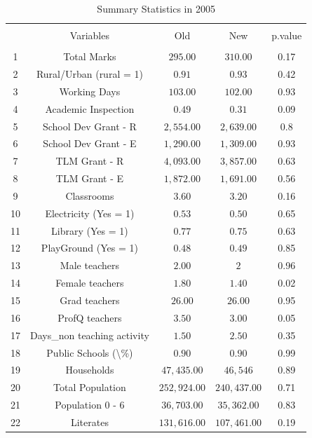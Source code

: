\documentclass[12pt, a4paper]{article}
\begin{document}
\begin{table}[!htbp] \centering 
  \caption{Summary Statistics in 2005} 
  \label{} 
\begin{tabular}{@{\extracolsep{5pt}} ccccc} 
\\[-1.8ex]\hline 
\hline \\[-1.8ex] 
 & Variables & Old & New & p.value \\ 
\hline \\[-1.8ex] 
1 & Total Marks & $295.00$ & $310.00$ & 0.17 \\ 
2 & Rural/Urban (rural = 1) & $0.91$ & $0.93$ & 0.42 \\ 
3 & Working Days & $103.00$ & $102.00$ & 0.93 \\ 
4 & Academic Inspection & $0.49$ & $0.31$ & 0.09 \\ 
5 & School Dev Grant - R & $2,554.00$ & $2,639.00$ & 0.8 \\ 
6 & School Dev Grant - E & $1,290.00$ & $1,309.00$ & 0.93 \\ 
7 & TLM Grant - R & $4,093.00$ & $3,857.00$ & 0.63 \\ 
8 & TLM Grant - E & $1,872.00$ & $1,691.00$ & 0.56 \\ 
9 & Classrooms & $3.60$ & $3.20$ & 0.16 \\ 
10 & Electricity (Yes = 1) & $0.53$ & $0.50$ & 0.65 \\ 
11 & Library  (Yes = 1) & $0.77$ & $0.75$ & 0.63 \\ 
12 & PlayGround  (Yes = 1) & $0.48$ & $0.49$ & 0.85 \\ 
13 & Male teachers & $2.00$ & $2$ & 0.96 \\ 
14 & Female teachers & $1.80$ & $1.40$ & 0.02 \\ 
15 & Grad teachers & $26.00$ & $26.00$ & 0.95 \\ 
16 & ProfQ teachers & $3.50$ & $3.00$ & 0.05 \\ 
17 & Days\_non teaching activity & $1.50$ & $2.50$ & 0.35 \\ 
18 & Public Schools (\textbackslash \%) & $0.90$ & $0.90$ & 0.99 \\ 
19 & Households & $47,435.00$ & $46,546$ & 0.89 \\ 
20 & Total Population & $252,924.00$ & $240,437.00$ & 0.71 \\ 
21 & Population 0 - 6 & $36,703.00$ & $35,362.00$ & 0.83 \\ 
22 & Literates & $131,616.00$ & $107,461.00$ & 0.19 \\ 

\end{tabular}
\end{table}
\end{document}
